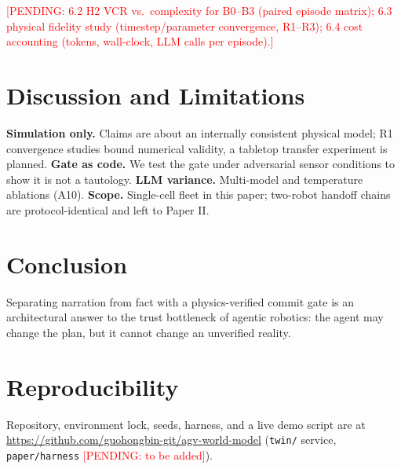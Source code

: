 \documentclass[11pt]{article}
\newcommand{\pending}[1]{\textcolor{red}{[PENDING: #1]}}
\begin{document}
\pending{6.2 H2 VCR vs.\ complexity for B0--B3 (paired episode matrix);
6.3 physical fidelity study (timestep/parameter convergence, R1--R3);
6.4 cost accounting (tokens, wall-clock, LLM calls per episode).}

\section{Discussion and Limitations}
\textbf{Simulation only.} Claims are about an internally consistent physical
model; R1 convergence studies bound numerical validity, a tabletop
transfer experiment is planned. \textbf{Gate as code.} We test the gate under
adversarial sensor conditions to show it is not a tautology.
\textbf{LLM variance.} Multi-model and temperature ablations (A10).
\textbf{Scope.} Single-cell fleet in this paper; two-robot handoff chains are
protocol-identical and left to Paper II.

\section{Conclusion}
Separating narration from fact with a physics-verified commit gate is an
architectural answer to the trust bottleneck of agentic robotics:
the agent may change the plan, but it cannot change an unverified reality.




\appendix
\section{Reproducibility}
Repository, environment lock, seeds, harness, and a live demo script are at
\url{https://github.com/guohongbin-git/agv-world-model}
(\texttt{twin/} service, \texttt{paper/harness} \pending{to be added}).
\end{document}
